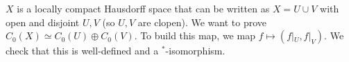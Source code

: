 \documentclass[a4paper]{article}
\begin{document}
\begin{exercise}[5]
	$X$ is a locally compact Hausdorff space that can be written as $X = U \cup V$ with open and disjoint $U,V$ (so $U,V$ are clopen). We want to prove $C_0(X) \simeq C_0(U) \oplus C_0(V)$. To build this map, we map $f \mapsto (f|_U, f|_V)$. We check that this is well-defined and a $^*$-isomorphism.
\end{exercise}
\end{document}
